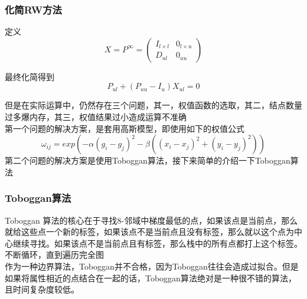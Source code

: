 \documentclass[notheorems, UTF8]{beamer}
\theoremstyle{plain}
\begin{document}
\begin{frame}
\frametitle{化简RW方法}
定义
\begin{displaymath}
X = P^\infty =  \left(
\begin{array}{ll}
I_{l \times l}      & 0_{l \times u}\\
D_{ul} & 0_{uu}
\end{array}
\right) 
\end{displaymath}

最终化简得到
\begin{displaymath}
P_{ul} + (P_{uu}-I_u)X_{ul} = 0
\end{displaymath}

但是在实际运算中，仍然存在三个问题，其一，权值函数的选取，其二，结点数量过多爆内存，其三，权值结果过小造成运算不准确\\
第一个问题的解决方案，是套用高斯模型，即使用如下的权值公式
\begin{displaymath}
\omega_{ij} = exp(-\alpha(g_i - g_j)^2 -\beta((x_i-x_j)^2 + (y_i-y_j)^2 ))
\end{displaymath}
第二个问题的解决方案是使用Toboggan算法，接下来简单的介绍一下Toboggan算法
\end{frame}



\begin{frame}
\frametitle{Toboggan算法}
Toboggan 算法的核心在于寻找8-邻域中梯度最低的点，如果该点是当前点，那么就给这些点一个新的标签，如果该点不是当前点且没有标签，那么就以这个点为中心继续寻找。如果该点不是当前点且有标签，那么栈中的所有点都打上这个标签。不断循环，直到遍历完全图\\

作为一种边界算法，Toboggan并不合格，因为Toboggan往往会造成过拟合。但是如果将属性相近的点结合在一起的话，Toboggan算法绝对是一种很不错的算法，且时间复杂度较低。
\end{frame}
\end{document}
